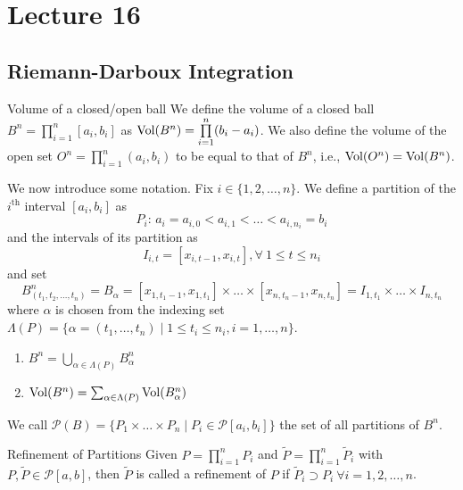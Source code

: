 \documentclass[../Analysis-3.tex]{subfiles}
\begin{document}
\chapter*{Lecture 16} %
\setcounter{chapter}{16} %
\setcounter{section}{0}

\section{Riemann-Darboux Integration}


\begin{Def}{Volume of a closed/open ball}{}
  We define the volume of a closed ball $B^n = \prod \limits_{i=1}^n [a_i, b_i]$ as $\operatorname{Vol}(B^n) = \prod \limits_{i=1}^n (b_i - a_i)$. We also define the volume of the open set $O^n = \prod \limits _{i=1}^n (a_i, b_i)$ to be equal to that of $B^n$, i.e., $\operatorname{Vol}(O^n) = \operatorname{Vol}(B^n)$.
\end{Def}

We now introduce some notation. Fix $i \in \{1,2, \dots, n\}$. We define a partition of the $i^{\text{th}}$ interval $[a_i, b_i]$ as
\[  P_i:\, a_i = a_{i,0} < a_{i,1} < \dots < a_{i,n_i} = b_i \]
and the intervals of its partition as
\[  I_{i,t} = [x_{i,t-1}, x_{i,t}], \forall \ 1 \leq t \leq n_i  \]
and set
\[
  B_{(t_1,t_2, \dots, t_n)}^n = B_\alpha = [x_{1,t_1-1}, x_{1,t_1}] \times \dots \times [x_{n,t_n-1}, x_{n,t_n}] = I_{1,t_1} \times \dots \times I_{n,t_n}
\]
where $\alpha$ is chosen from the indexing set $\Lambda (P) = \{\alpha = (t_1, \dots, t_n) \mid 1 \leq t_i \leq n_i, i=1, \dots, n\}$.

\begin{noteBox}
  \begin{enumerate}
    \item $B^n = \bigcup_{\alpha \in \Lambda (P)} B^n_\alpha$
    \item $\operatorname{Vol}(B^n) = \sum_{\alpha \in \Lambda (P)} \operatorname{Vol}(B_\alpha ^n)$
  \end{enumerate}
\end{noteBox}

We call $\mathscr{P}(B) = \{P_1 \times \dots \times P_n \mid P_i \in \mathscr{P}[a_i, b_i]\}$ the set of all partitions of $B^n$.

\begin{Def}{Refinement of Partitions}{}
  Given $\displaystyle P = \prod_{i=1}^n P_i$ and $\displaystyle\widetilde{P} = \prod_{i=1}^n \widetilde{P}_{i}$ with $P, \widetilde{P} \in \mathscr{P}[a,b]$, then $\widetilde{P}$ is called a refinement of $P$ if $\widetilde{P}_{i} \supset P_i \ \forall i = 1, 2, \dots, n$.
\end{Def}
\end{document}
